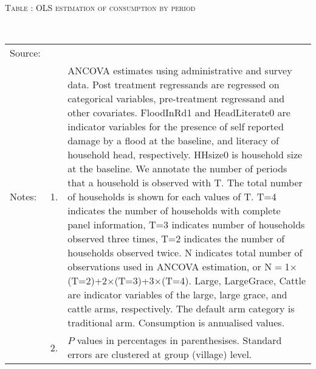 \hspace{-1cm}\begin{minipage}[t]{14cm}
\hfil\textsc{\normalsize Table \thetable: OLS estimation of consumption by period\label{tab ANCOVA consumption timevarying}}\\
\setlength{\tabcolsep}{1pt}
\setlength{\baselineskip}{8pt}
\renewcommand{\arraystretch}{.55}
\hfil{}\\
\renewcommand{\arraystretch}{.8}
\setlength{\tabcolsep}{1pt}
\begin{tabular}{>{\hfill\scriptsize}p{1cm}<{}>{\hfill\scriptsize}p{.25cm}<{}>{\scriptsize}p{12cm}<{\hfill}}
Source:& \multicolumn{2}{l}{\scriptsize Estimated with GUK administrative and survey data.}\\
Notes: & 1. & ANCOVA estimates using administrative and survey data. Post treatment regressands are regressed on categorical variables, pre-treatment regressand and other covariates. \textsf{FloodInRd1} and \textsf{HeadLiterate0} are indicator variables for the presence of self reported damage by a flood at the baseline, and literacy of household head, respectively. \textsf{HHsize0} is household size at the baseline. We annotate the number of periods that a household is observed with \textsf{T}. The total number of households is shown for each values of \textsf{T}. \textsf{T=4} indicates the number of households with complete panel information, \textsf{T=3} indicates number of households observed three times, \textsf{T=2} indicates the number of households observed twice. \textsf{N} indicates total number of observations used in ANCOVA estimation, or \textsf{N$=$1$\times$(T=2)+2$\times$(T=3)+3$\times$(T=4)}.  \textsf{Large}, \textsf{LargeGrace}, \textsf{Cattle} are indicator variables of the \textsf{large}, \textsf{large grace}, and \textsf{cattle} arms, respectively. The default arm category is \textsf{traditional} arm. Consumption is annualised values. \\
& 2. & $P$ values in percentages in parenthesises. Standard errors are clustered at group (village) level.
\end{tabular}
\end{minipage}


